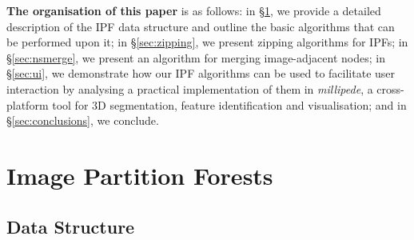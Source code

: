 \documentclass[10pt,twocolumn,twoside]{IEEEtran}
\begin{document}

\textbf{The organisation of this paper} is as follows: in \S\ref{sec:ipfs}, we provide a detailed description of the IPF data structure and outline the basic algorithms that can be performed upon it; in \S\ref{sec:zipping}, we present zipping algorithms for IPFs; in \S\ref{sec:nsmerge}, we present an algorithm for merging image-adjacent nodes; in \S\ref{sec:ui}, we demonstrate how our IPF algorithms can be used to facilitate user interaction by analysing a practical implementation of them in \emph{millipede}, a cross-platform tool for 3D segmentation, feature identification and visualisation; and in \S\ref{sec:conclusions}, we conclude.

\section{Image Partition Forests}
\label{sec:ipfs}

\subsection{Data Structure}
\end{document}
